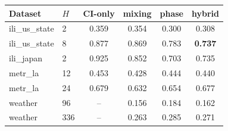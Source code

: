 \begin{tabular}{llcccc}
\toprule
Dataset & $H$ & CI-only & mixing & phase & \textbf{hybrid} \\
\midrule
ili\_us\_state & 2 & 0.359 & 0.354 & 0.300 & 0.308 \\
ili\_us\_state & 8 & 0.877 & 0.869 & 0.783 & \textbf{0.737} \\
ili\_japan & 2 & 0.925 & 0.852 & 0.703 & 0.735 \\
metr\_la & 12 & 0.453 & 0.428 & 0.444 & 0.440 \\
metr\_la & 24 & 0.679 & 0.632 & 0.654 & 0.677 \\
weather & 96 & -- & 0.156 & 0.184 & 0.162 \\
weather & 336 & -- & 0.263 & 0.285 & 0.271 \\
\bottomrule
\end{tabular}
